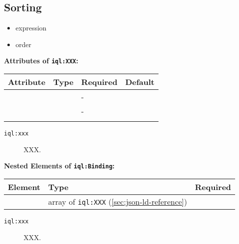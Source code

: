 \documentclass[11pt]{article}
\newcommand{\iqlns}{iql:}
\newcommand{\iqlType}[1]{\texttt{\iqlns#1}}
\newcommand{\attributes}[1]{\noindent\textbf{Attributes of \iqlType{#1}:}\newline\medskip}
\newcommand{\elements}[1]{\noindent\textbf{Nested Elements of \iqlType{#1}:}\newline\medskip}
\begin{document}
\subsection{Sorting}
\label{sec:json-ld-sorting}
\begin{itemize}
\item expression
\item order
\end{itemize}
\attributes{XXX}
\begin{tabular}{|p{}|p{}|p{}|p{}|}
	\hline
	\textbf{Attribute} & \textbf{Type} & \textbf{Required} & \textbf{Default} \\ 
	\hline
	\hline
	&  & - &  \\ 
	\hline 
	&  & - &  \\ 
	\hline 
	&  &  & \\ 
	\hline 
\end{tabular}
\begin{description}
	\item[\iqlType{xxx}] XXX.
\end{description}
\elements{Binding}
\begin{tabular}{|p{}|p{}|p{}|}
	\hline
	\textbf{Element} & \textbf{Type} & \textbf{Required} \\ 
	\hline
	\hline 
	& array of \iqlType{XXX} (\ref{sec:json-ld-reference}) &  \\ 
	\hline 
\end{tabular}
\begin{description}
	\item[\iqlType{xxx}] XXX.
\end{description}

\end{document}
